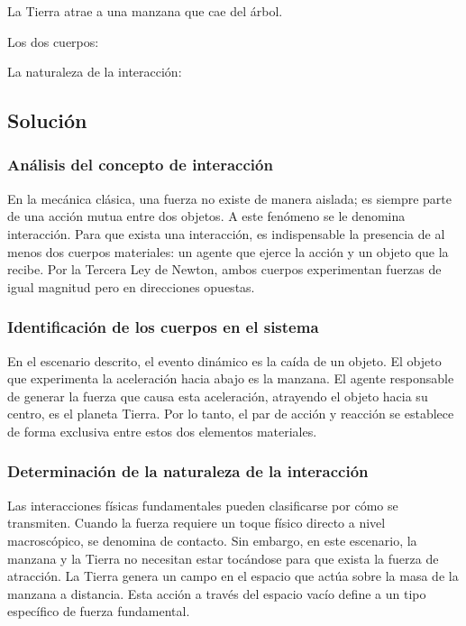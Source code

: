 \documentclass[12pt, a4paper]{article}
\begin{document}
La Tierra atrae a una manzana que cae del árbol.

Los dos cuerpos: \underline{\hspace{8cm}}

La naturaleza de la interacción: \underline{\hspace{8cm}}

\subsection*{Solución}

\subsubsection*{Análisis del concepto de interacción}
En la mecánica clásica, una fuerza no existe de manera aislada; es siempre parte de una acción mutua entre dos objetos. A este fenómeno se le denomina interacción. Para que exista una interacción, es indispensable la presencia de al menos dos cuerpos materiales: un agente que ejerce la acción y un objeto que la recibe. Por la Tercera Ley de Newton, ambos cuerpos experimentan fuerzas de igual magnitud pero en direcciones opuestas.

\subsubsection*{Identificación de los cuerpos en el sistema}
En el escenario descrito, el evento dinámico es la caída de un objeto. El objeto que experimenta la aceleración hacia abajo es la manzana. El agente responsable de generar la fuerza que causa esta aceleración, atrayendo el objeto hacia su centro, es el planeta Tierra. Por lo tanto, el par de acción y reacción se establece de forma exclusiva entre estos dos elementos materiales.

\subsubsection*{Determinación de la naturaleza de la interacción}
Las interacciones físicas fundamentales pueden clasificarse por cómo se transmiten. Cuando la fuerza requiere un toque físico directo a nivel macroscópico, se denomina de contacto. Sin embargo, en este escenario, la manzana y la Tierra no necesitan estar tocándose para que exista la fuerza de atracción. La Tierra genera un campo en el espacio que actúa sobre la masa de la manzana a distancia. Esta acción a través del espacio vacío define a un tipo específico de fuerza fundamental.
\end{document}
